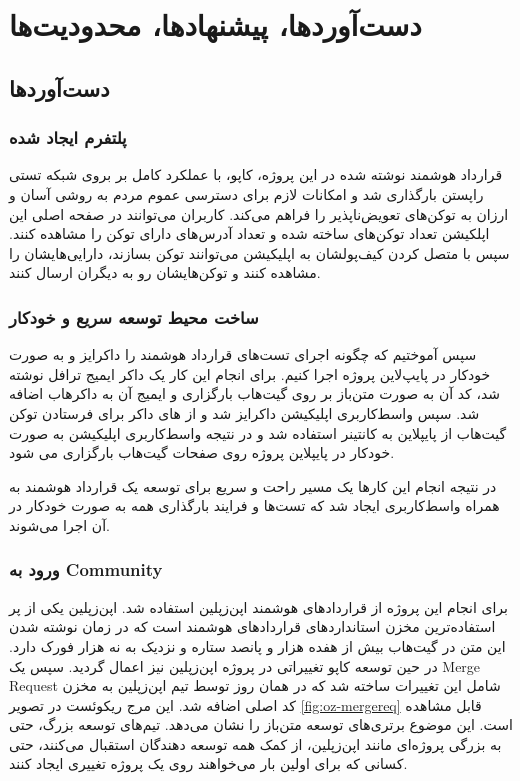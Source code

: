 \chapter{دست‌آوردها، پیشنهاد‌ها، محدودیت‌ها}

\section{دست‌آوردها}

\subsection{پلتفرم ایجاد شده}
قرارداد هوشمند نوشته شده در این پروژه،
کاپو، با عملکرد کامل بر بروی شبکه تستی راپستن بارگذاری شد
و امکانات لازم برای دسترسی عموم مردم به روشی آسان و ارزان به توکن‌های تعویض‌ناپذیر را فراهم می‌کند.
کاربران می‌توانند در صفحه اصلی این اپلکیشن تعداد توکن‌های ساخته شده و تعداد آدرس‌های دارای توکن را مشاهده کنند.
سپس با متصل کردن کیف‌پولشان به اپلیکیشن می‌توانند توکن بسازند،
دارایی‌هایشان را مشاهده کنند و توکن‌هایشان رو به دیگران ارسال کنند.

\subsection{ساخت محیط توسعه سریع و خودکار}
سپس آموختیم که چگونه اجرای تست‌های قرارداد هوشمند را داکرایز و به صورت خودکار در پایپ‌لاین پروژه اجرا کنیم.
برای انجام این کار یک داکر ایمیج ترافل نوشته شد،
کد آن به صورت متن‌باز بر روی گیت‌هاب بارگزاری و ایمیج آن به داکرهاب اضافه شد. سپس واسط‌کاربری اپلیکیشن داکرایز شد و از
های داکر برای فرستادن توکن گیت‌هاب از پایپلاین به کانتینر استفاده شد
و در نتیجه واسط‌کاربری اپلیکیشن به صورت خودکار در پایپلاین پروژه روی صفحات گیت‌هاب بارگزاری می شود.

در نتیجه انجام این کارها یک مسیر راحت و سریع برای توسعه یک قرارداد هوشمند به همراه واسط‌کاربری ایجاد شد که تست‌ها
و فرایند بارگذاری همه به صورت خودکار در آن اجرا می‌شوند.


\subsection{ورود به
\gls{Community}}
برای انجام این پروژه از قرارداد‌های هوشمند اپن‌زپلین استفاده شد.
اپن‌زپلین یکی از پر استفاده‌ترین مخزن استانداردهای قراردادهای هوشمند است
که در زمان نوشته شدن این متن در گیت‌هاب بیش از هفده هزار و پانصد ستاره و نزدیک به نه هزار فورک دارد.
در حین توسعه کاپو تغییراتی در پروژه اپن‌زپلین نیز اعمال گردید.
سپس یک
\gls{Merge Request}
شامل این تغییرات ساخته شد که در همان روز توسط تیم اپن‌زپلین به مخزن کد اصلی اضافه شد.
این مرج ریکوئست در تصویر
\ref{fig:oz-mergereq}
قابل مشاهده است.
این موضوع برتری‌های توسعه متن‌باز را نشان می‌دهد.
تیم‌های توسعه بزرگ، حتی به بزرگی پروژه‌ای مانند اپن‌زپلین، از کمک همه توسعه دهندگان استقبال می‌کنند،
حتی کسانی که برای اولین بار می‌خواهند روی یک پروژه تغییری ایجاد کنند.


